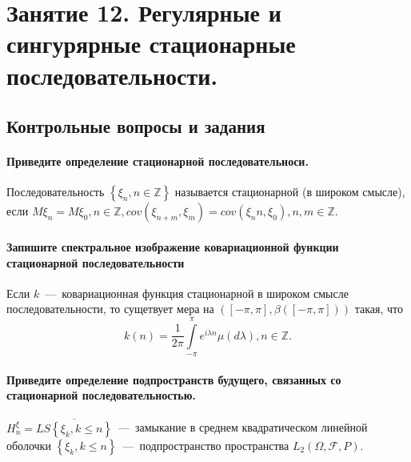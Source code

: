 \chapter*{Занятие 12. Регулярные и сингурярные стационарные последовательности.}

\section*{Контрольные вопросы и задания}

\subsubsection*{Приведите определение стационарной последовательноси.}

Последовательность $ \left\{ \xi_n, n \in \mathbb{Z} \right\} $ называется стационарной
(в широком смысле), если
$M \xi_n = M \xi_0, n \in \mathbb{Z},
  cov \left( \xi_{n + m}, \xi_m \right) = cov \left( \xi_nn, \xi_0 \right), n, m \in \mathbb{Z}$.

\subsubsection*{Запишите спектральное изображение ковариационной функции стационарной
                последовательности}

Если $k$~---~ковариационная функция стационарной в широком смысле последовательности,
то сущетвует мера на
$ \left( \left[ -\pi, \pi \right], \beta \left( \left[ -\pi, \pi \right] \right) \right)$ такая, что
\begin{equation*}
  k \left( n \right) =
  \frac{1}{2 \pi } \int \limits_{-\pi }^{ \pi } e^{i \lambda n} \mu \left( d \lambda \right),
  n \in \mathbb{Z}.
\end{equation*}

\subsubsection*{Приведите определение подпространств будущего,
                связанных со стационарной последовательностью.}
$H_n^{ \xi } = \overline{LS \left\{ \xi_k, k \leq n \right\} }$~---~замыкание
в среднем квадратическом линейной оболочки
$ \left\{ \xi_k, k \leq n \right\} $~---~подпространство пространства
$L_2 \left( \Omega, \mathcal{F}, P \right) $.

